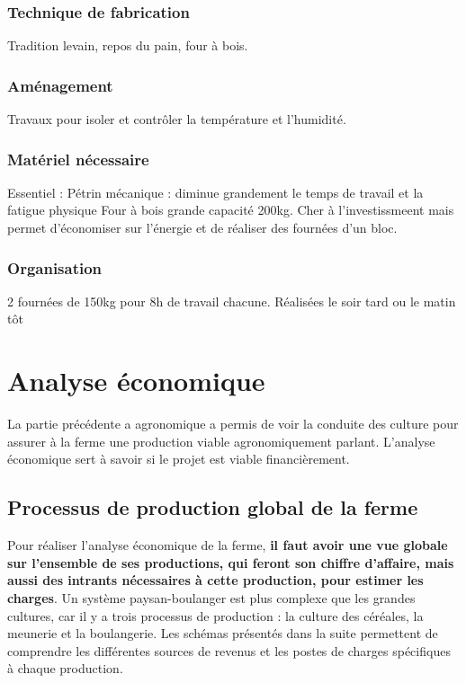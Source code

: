 \documentclass{book}
\begin{document}
\subsection{Technique de fabrication}

Tradition levain, repos du pain, four à bois.

\subsection{Aménagement}

Travaux pour isoler et contrôler la température et l'humidité. 

\subsection{Matériel nécessaire}

Essentiel : 
Pétrin mécanique : diminue grandement le temps de travail et la fatigue physique
Four à bois grande capacité 200kg. Cher à l'investissmeent mais permet d'économiser sur l'énergie et de réaliser des fournées d'un bloc.

\subsection{Organisation}

2 fournées de 150kg pour 8h de travail chacune. Réalisées le soir tard ou le matin tôt

\chapter{Analyse économique}
\label{part:chap_eco}

La partie précédente a agronomique a permis de voir la conduite des culture pour assurer à la ferme une production viable agronomiquement parlant. L'analyse économique sert à savoir si le projet est viable financièrement.

\section{Processus de production global de la ferme}

Pour réaliser l'analyse économique de la ferme, \textbf{il faut avoir une vue globale sur l'ensemble de ses productions, qui feront son chiffre d'affaire, mais aussi des intrants nécessaires à cette production, pour estimer les charges}. Un système paysan-boulanger est plus complexe que les grandes cultures, car il y a trois processus de production : la culture des céréales, la meunerie et la boulangerie. Les schémas présentés dans la suite permettent de comprendre les différentes sources de revenus et les postes de charges spécifiques à chaque production.
\end{document}
